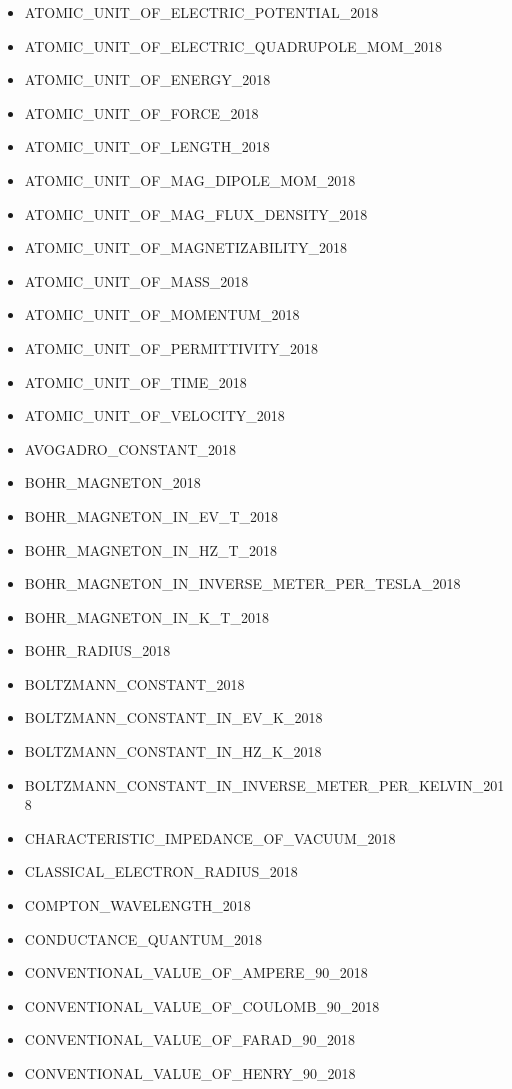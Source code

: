\begin{itemize}
\item ATOMIC\_UNIT\_OF\_ELECTRIC\_POTENTIAL\_2018
\item ATOMIC\_UNIT\_OF\_ELECTRIC\_QUADRUPOLE\_MOM\_2018
\item ATOMIC\_UNIT\_OF\_ENERGY\_2018
\item ATOMIC\_UNIT\_OF\_FORCE\_2018
\item ATOMIC\_UNIT\_OF\_LENGTH\_2018
\item ATOMIC\_UNIT\_OF\_MAG\_DIPOLE\_MOM\_2018
\item ATOMIC\_UNIT\_OF\_MAG\_FLUX\_DENSITY\_2018
\item ATOMIC\_UNIT\_OF\_MAGNETIZABILITY\_2018
\item ATOMIC\_UNIT\_OF\_MASS\_2018
\item ATOMIC\_UNIT\_OF\_MOMENTUM\_2018
\item ATOMIC\_UNIT\_OF\_PERMITTIVITY\_2018
\item ATOMIC\_UNIT\_OF\_TIME\_2018
\item ATOMIC\_UNIT\_OF\_VELOCITY\_2018
\item AVOGADRO\_CONSTANT\_2018
\item BOHR\_MAGNETON\_2018
\item BOHR\_MAGNETON\_IN\_EV\_T\_2018
\item BOHR\_MAGNETON\_IN\_HZ\_T\_2018
\item BOHR\_MAGNETON\_IN\_INVERSE\_METER\_PER\_TESLA\_2018
\item BOHR\_MAGNETON\_IN\_K\_T\_2018
\item BOHR\_RADIUS\_2018
\item BOLTZMANN\_CONSTANT\_2018
\item BOLTZMANN\_CONSTANT\_IN\_EV\_K\_2018
\item BOLTZMANN\_CONSTANT\_IN\_HZ\_K\_2018
\item BOLTZMANN\_CONSTANT\_IN\_INVERSE\_METER\_PER\_KELVIN\_2018
\item CHARACTERISTIC\_IMPEDANCE\_OF\_VACUUM\_2018
\item CLASSICAL\_ELECTRON\_RADIUS\_2018
\item COMPTON\_WAVELENGTH\_2018
\item CONDUCTANCE\_QUANTUM\_2018
\item CONVENTIONAL\_VALUE\_OF\_AMPERE\_90\_2018
\item CONVENTIONAL\_VALUE\_OF\_COULOMB\_90\_2018
\item CONVENTIONAL\_VALUE\_OF\_FARAD\_90\_2018
\item CONVENTIONAL\_VALUE\_OF\_HENRY\_90\_2018

\end{itemize}
